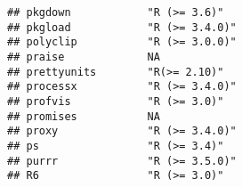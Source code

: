 \documentclass[
]{article}
\begin{document}
\begin{verbatim}
## pkgdown            "R (>= 3.6)"                                                                                                                                                                                          
## pkgload            "R (>= 3.4.0)"                                                                                                                                                                                        
## polyclip           "R (>= 3.0.0)"                                                                                                                                                                                        
## praise             NA                                                                                                                                                                                                    
## prettyunits        "R(>= 2.10)"                                                                                                                                                                                          
## processx           "R (>= 3.4.0)"                                                                                                                                                                                        
## profvis            "R (>= 3.0)"                                                                                                                                                                                          
## promises           NA                                                                                                                                                                                                    
## proxy              "R (>= 3.4.0)"                                                                                                                                                                                        
## ps                 "R (>= 3.4)"                                                                                                                                                                                          
## purrr              "R (>= 3.5.0)"                                                                                                                                                                                        
## R6                 "R (>= 3.0)"                                                                                                                                                                                          

\end{verbatim}
\end{document}
